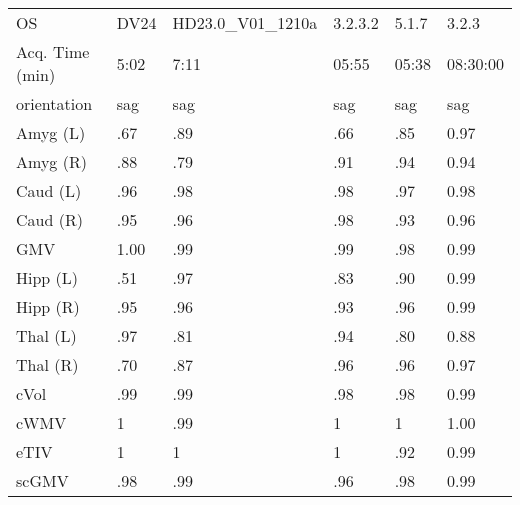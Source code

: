 \begin{table}
\begin{tabular}{llllll}
OS                    &                      DV24 &            HD23.0\_V01\_1210a &               3.2.3.2 &              5.1.7 &                3.2.3 \\
Acq. Time (min)       &               5:02 &  7:11 &              05:55 &           05:38 &             08:30:00 \\
orientation           &               sag &                         sag &                   sag &                sag &                  sag \\
Amyg (L)              &                   .67 &                        .89 &                  .66 &               .85 &                 0.97 \\
Amyg (R)              &                   .88 &                        .79 &                  .91 &               .94 &                 0.94 \\
Caud (L)              &                   .96 &                        .98 &                  .98 &               .97 &                 0.98 \\
Caud (R)              &                   .95 &                        .96 &                  .98 &               .93 &                 0.96 \\
GMV                   &                   1.00 &                        .99 &                  .99 &               .98 &                 0.99 \\
Hipp (L)              &                   .51 &                        .97 &                  .83 &               .90 &                 0.99 \\
Hipp (R)              &                   .95 &                        .96 &                  .93 &               .96 &                 0.99 \\
Thal (L)              &                   .97 &                        .81 &                  .94 &               .80 &                 0.88 \\
Thal (R)              &                   .70 &                        .87 &                  .96 &               .96 &                 0.97 \\
cVol                  &                   .99 &                        .99 &                  .98 &               .98 &                 0.99 \\
cWMV                  &                   1 &                        .99 &                  1 &               1 &                 1.00 \\
eTIV                  &                   1 &                        1 &                  1 &               .92 &                 0.99 \\
scGMV                 &                   .98 &                        .99 &                  .96 &               .98 &                 0.99 \\
\bottomrule
\end{tabular}


\end{table}
